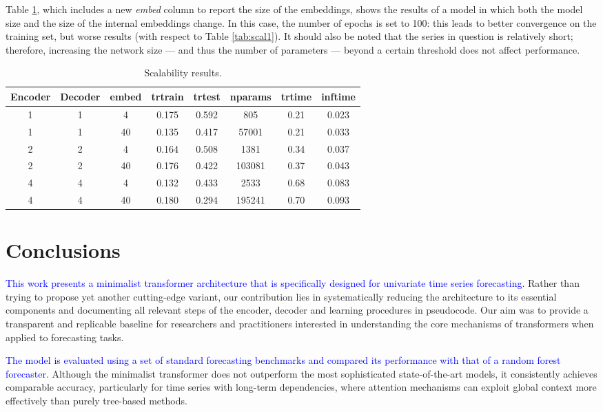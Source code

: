 \documentclass[algorithms,article,submit,pdftex,moreauthors]{Definitions/mdpi}
\begin{document}
{Table \ref{tab:scal2}, which includes a new {\it embed} column to report the size of the embeddings, shows the results of a model in which both the model size and the size of the internal embeddings change. In this case, the number of epochs is set to 100: this leads to better convergence on the training set, but worse results (with respect to Table \ref{tab:scal1}). It should also be noted that the series in question is relatively short; therefore, increasing the network size — and thus the number of parameters — beyond a certain threshold does not affect performance.

\begin{table}[H]
	\caption{Scalability results.}
	\label{tab:scal2}
	\centering
	\begin{tabular}{ccc | ccccc}
		Encoder & Decoder & embed & trtrain & trtest & nparams & trtime & inftime \\
		\toprule
		1 & 1 & 4 & 0.175 & 0.592 & 805 & 0.21 & 0.023 \\
		1 & 1 & 40 & 0.135 & 0.417 & 57001 & 0.21 & 0.033 \\
		2 & 2 & 4 & 0.164 & 0.508 & 1381 & 0.34 & 0.037 \\
		2 & 2 & 40 & 0.176 & 0.422 & 103081 & 0.37 & 0.043 \\
		4 & 4 & 4 & 0.132 & 0.433 & 2533 & 0.68 & 0.083 \\
		4 & 4 & 40 & 0.180 & 0.294 & 195241 & 0.70 & 0.093 \\
		\bottomrule
	\end{tabular}
\end{table}
}

\section{Conclusions} \label{sec:conclusions}

\textcolor{blue}{This work presents a minimalist transformer architecture that is specifically designed for univariate time series forecasting}. Rather than trying to propose yet another cutting-edge variant, our contribution lies in systematically reducing the architecture to its essential components and documenting all relevant steps of the encoder, decoder and learning procedures in pseudocode. Our aim was to provide a transparent and replicable baseline for researchers and practitioners interested in understanding the core mechanisms of transformers when applied to forecasting tasks.

\textcolor{blue}{The model is evaluated using a set of standard forecasting benchmarks and compared its performance with that of a random forest forecaster}. Although the minimalist transformer does not outperform the most sophisticated state-of-the-art models, it consistently achieves comparable accuracy, particularly for time series with long-term dependencies, where attention mechanisms can exploit global context more effectively than purely tree-based methods.
\end{document}
